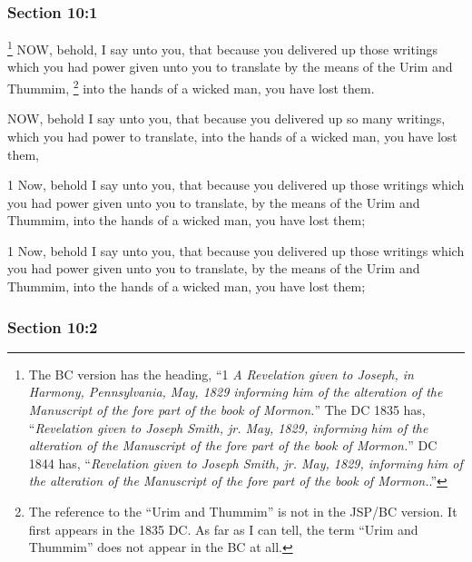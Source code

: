 	\subsubsection{Section 10:1} %
		\label{DC10-1}

			\footnote{%
				The BC version has the heading, ``1 \textit{A Revelation given to Joseph, in Harmony, Pennsylvania, May, 1829 informing him of the alteration of the Manuscript of the fore part of the book of Mormon.}'' The DC 1835 has, ``\textit{Revelation given to Joseph Smith, jr. May, 1829, informing him of the alteration of the Manuscript of the fore part of the book of Mormon.}'' DC 1844 has, ``\textit{Revelation given to Joseph Smith, jr. May, 1829, informing him of the alteration of the Manuscript of the fore part of the book of Mormon.}.''
				}%
		NOW, behold, I say unto you, that because you delivered up those writings which you had power given unto you to translate by the means of the Urim and Thummim,%
			\footnote{%
				The reference to the ``Urim and Thummim'' is not in the JSP/BC version. It first appears in the 1835 DC. As far as I can tell, the term ``Urim and Thummim'' does not appear in the BC at all.
				}
		into the hands of a wicked man, you have lost them.

		\begin{framed}
		\scriptsize
			\begin{compactdesc}
				\item[JSP] NOW, behold I say unto you, that because you delivered up so many writings, which you had power to translate, into the hands of a wicked man, you have lost them,
				\item[RB1] [\textit{missing}]
				\item[DC 1835] 1 Now, behold I say unto you, that because you delivered up those writings which you had power given unto you to translate, by the means of the Urim and Thummim, into the hands of a wicked man, you have lost them;
				\item[DC 1844] 1 Now, behold I say unto you, that because you delivered up those writings which you had power given unto you to translate, by the means of the Urim and Thummim, into the hands of a wicked man, you have lost them;

			\end{compactdesc}
		\end{framed}

	\subsubsection{Section 10:2} %
		\label{DC10-2}

